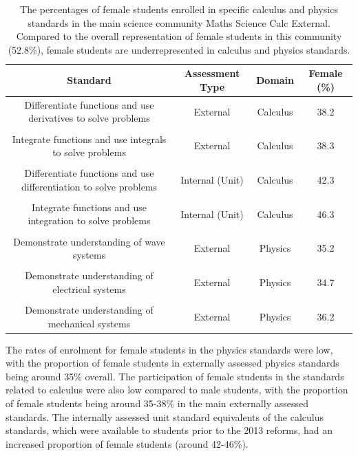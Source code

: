 \documentclass[a4paper]{article}
\begin{document}
\begin{table}[ht!]
\begin{tabular}{|c|c|c|c|}
\hline
Standard & Assessment Type & Domain   & Female (\%) \\ \hline
     Differentiate functions and use derivatives to solve problems & External & Calculus & 38.2\\
      & & & \\
     Integrate functions and use integrals to solve problems & External & Calculus & 38.3\\
      & & & \\
     Differentiate functions and use differentiation to solve problems & Internal (Unit) & Calculus  &    42.3   \\
     & & & \\
     Integrate functions and use integration to solve problems & Internal (Unit) & Calculus & 46.3\\
      & & & \\
      Demonstrate understanding of wave systems & External & Physics  &  35.2\\
      & & & \\
     Demonstrate understanding of electrical systems & External & Physics  & 34.7 \\
      & & & \\
      Demonstrate understanding of mechanical systems & External & Physics & 36.2 
      \\ \hline
\end{tabular}  \caption{The percentages of female students enrolled in specific calculus and physics standards in the main science community Maths Science Calc External. Compared to the overall representation of female students in this community (52.8\%), female students are underrepresented in calculus and physics standards.}  \label{table:StdattainmentGender}

\end{table}

The rates of enrolment for female students in the physics standards were low, with the proportion of female students in externally assessed physics standards being around 35\% overall. The participation of female students in the standards related to calculus were also low compared to male students, with the proportion of female students being around 35-38\% in the main externally assessed standards. The internally assessed unit standard equivalents of the calculus standards, which were available to students prior to the 2013 reforms, had an increased proportion of female students (around 42-46\%). 
\end{document}
